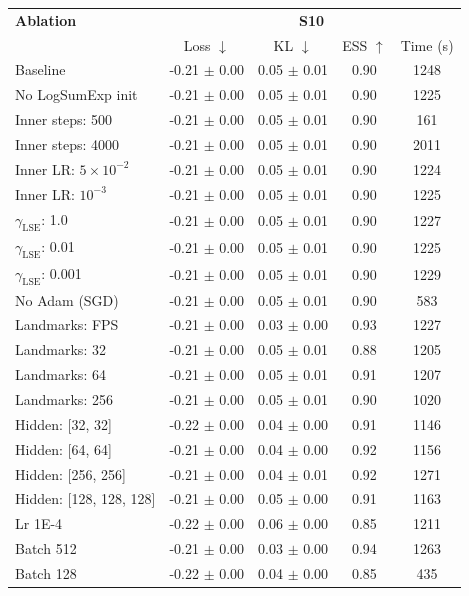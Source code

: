 \begin{tabular}{lcccc}
\toprule
\textbf{Ablation} & \multicolumn{4}{c}{\textbf{S10}} \\
 & Loss $\downarrow$ & KL $\downarrow$ & ESS $\uparrow$ & Time (s) \\
\midrule
Baseline & -0.21 $\pm$ 0.00 & 0.05 $\pm$ 0.01 & 0.90 & 1248 \\
No LogSumExp init & -0.21 $\pm$ 0.00 & 0.05 $\pm$ 0.01 & 0.90 & 1225 \\
Inner steps: 500 & -0.21 $\pm$ 0.00 & 0.05 $\pm$ 0.01 & 0.90 & 161 \\
Inner steps: 4000 & -0.21 $\pm$ 0.00 & 0.05 $\pm$ 0.01 & 0.90 & 2011 \\
Inner LR: $5 \times 10^{-2}$ & -0.21 $\pm$ 0.00 & 0.05 $\pm$ 0.01 & 0.90 & 1224 \\
Inner LR: $10^{-3}$ & -0.21 $\pm$ 0.00 & 0.05 $\pm$ 0.01 & 0.90 & 1225 \\
$\gamma_{\text{LSE}}$: 1.0 & -0.21 $\pm$ 0.00 & 0.05 $\pm$ 0.01 & 0.90 & 1227 \\
$\gamma_{\text{LSE}}$: 0.01 & -0.21 $\pm$ 0.00 & 0.05 $\pm$ 0.01 & 0.90 & 1225 \\
$\gamma_{\text{LSE}}$: 0.001 & -0.21 $\pm$ 0.00 & 0.05 $\pm$ 0.01 & 0.90 & 1229 \\
No Adam (SGD) & -0.21 $\pm$ 0.00 & 0.05 $\pm$ 0.01 & 0.90 & 583 \\
Landmarks: FPS & -0.21 $\pm$ 0.00 & 0.03 $\pm$ 0.00 & 0.93 & 1227 \\
Landmarks: 32 & -0.21 $\pm$ 0.00 & 0.05 $\pm$ 0.01 & 0.88 & 1205 \\
Landmarks: 64 & -0.21 $\pm$ 0.00 & 0.05 $\pm$ 0.01 & 0.91 & 1207 \\
Landmarks: 256 & -0.21 $\pm$ 0.00 & 0.05 $\pm$ 0.01 & 0.90 & 1020 \\
Hidden: [32, 32] & -0.22 $\pm$ 0.00 & 0.04 $\pm$ 0.00 & 0.91 & 1146 \\
Hidden: [64, 64] & -0.21 $\pm$ 0.00 & 0.04 $\pm$ 0.00 & 0.92 & 1156 \\
Hidden: [256, 256] & -0.21 $\pm$ 0.00 & 0.04 $\pm$ 0.01 & 0.92 & 1271 \\
Hidden: [128, 128, 128] & -0.21 $\pm$ 0.00 & 0.05 $\pm$ 0.00 & 0.91 & 1163 \\
Lr 1E-4 & -0.22 $\pm$ 0.00 & 0.06 $\pm$ 0.00 & 0.85 & 1211 \\
Batch 512 & -0.21 $\pm$ 0.00 & 0.03 $\pm$ 0.00 & 0.94 & 1263 \\
Batch 128 & -0.22 $\pm$ 0.00 & 0.04 $\pm$ 0.00 & 0.85 & 435 \\
\bottomrule
\end{tabular}